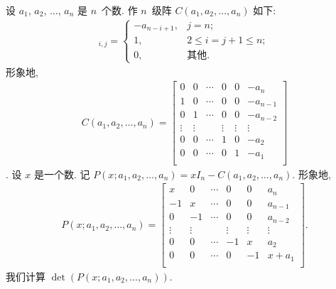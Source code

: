 \begin{example}
    设 \(a_1\), \(a_2\), \(\dots\), \(a_n\) 是 \(n\)~个数.
    作 \(n\)~级阵 \(C(a_1, a_2, \dots, a_n)\) 如下:
    \begin{align*}
        [C(a_1, a_2, \dots, a_n)]_{i,j}
        = \begin{cases}
              -a_{n-i+1}, & j = n;                   \\
              1,          & 2 \leq i = j + 1 \leq n; \\
              0,          & \text{其他}.
          \end{cases}
    \end{align*}
    形象地,
    \begin{align*}
        C(a_1, a_2, \dots, a_n)
        = \begin{bmatrix}
              0      & 0      & \cdots & 0      & 0      & -a_n     \\
              1      & 0      & \cdots & 0      & 0      & -a_{n-1} \\
              0      & 1      & \cdots & 0      & 0      & -a_{n-2} \\
              \vdots & \vdots & {}     & \vdots & \vdots & \vdots   \\
              0      & 0      & \cdots & 1      & 0      & -a_2     \\
              0      & 0      & \cdots & 0      & 1      & -a_1     \\
          \end{bmatrix}
    \end{align*}.
    设 \(x\) 是一个数.
    记 \(P(x; a_1, a_2, \dots, a_n) = xI_n - C(a_1, a_2, \dots, a_n)\).
    形象地,
    \begin{align*}
        P(x; a_1, a_2, \dots, a_n)
        = \begin{bmatrix}
              x      & 0      & \cdots & 0      & 0      & a_n     \\
              -1     & x      & \cdots & 0      & 0      & a_{n-1} \\
              0      & -1     & \cdots & 0      & 0      & a_{n-2} \\
              \vdots & \vdots & {}     & \vdots & \vdots & \vdots  \\
              0      & 0      & \cdots & -1     & x      & a_2     \\
              0      & 0      & \cdots & 0      & -1     & x + a_1 \\
          \end{bmatrix}.
    \end{align*}
    我们计算 \(\det {(P(x; a_1, a_2, \dots, a_n))}\).


\end{example}

